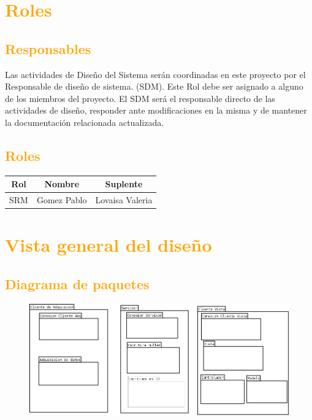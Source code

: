 \newpage
\section{\textcolor{orange}{Roles}}
\subsection{\textcolor{orange}{Responsables}}

Las actividades de Diseño del Sistema serán coordinadas en este proyecto por el Responsable de diseño de sistema. (SDM). Este Rol debe ser asignado a alguno de los miembros del proyecto.
El SDM será el responsable directo de las actividades de diseño, responder ante modificaciones en la misma  y de mantener la documentación relacionada actualizada.


\subsection{\textcolor{orange}{Roles}}
\begin{table}[!h]
\begin{center}
\begin{tabular}{|c|c|c|}
\hline
\rowcolor[RGB]{255,127,0} Rol & Nombre & Suplente\\
\hline
SRM & Gomez Pablo & Lovaisa Valeria\\
\hline
\end{tabular}
\end{center}
\end{table}

\newpage
\section{\textcolor{orange}{Vista general del diseño}}
\subsection{\textcolor{orange}{Diagrama de paquetes}}
\begin{figure}[h!]
 \begin{center}
  \includegraphics[width=1\textwidth,keepaspectratio=true]{img/diagrama_paquetes.png}
  \label{fig:esquema}
 \end{center}
\end{figure}


